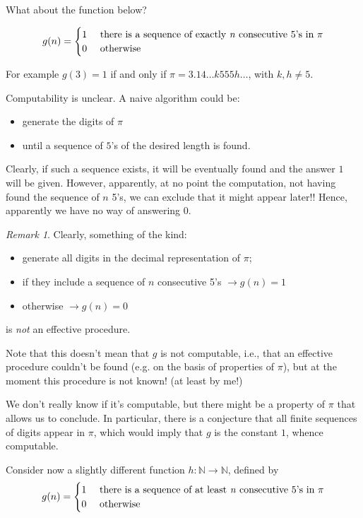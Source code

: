 \documentclass{amsbook}
\newcommand{\nat}{\ensuremath{\mathbb{N}}}
\theoremstyle{definition}
\theoremstyle{remark}
\newtheorem{remark}[theorem]{Remark}
\numberwithin{section}{chapter}
\numberwithin{equation}{chapter}
\begin{document}
What about the function below?

\begin{equation*}
  g(n) = \begin{cases}
    1 & $ there is a sequence of exactly  \textit{n} consecutive $5$'s in $ \pi \\
    0 & $ otherwise $
	\end{cases}
\end{equation*}

For example $g(3) = 1$ if and only if  $\pi = 3.14 \dots k 555 h \dots $, with $k, h \neq 5$.

Computability is unclear. A naive algorithm could be:
\begin{itemize}
\item generate the digits of $\pi$
\item until a sequence of $5$'s of the desired length is found.
\end{itemize}
Clearly, if such a sequence exists, it will be eventually
found and the answer $1$ will be given. However, apparently, at no point
the computation, not having found the sequence of $n$ 5's,  we can exclude that it might appear later!! Hence, apparently we have no way of answering $0$.

\begin{remark}
  Clearly, something of the kind:
   \begin{itemize}
   \item generate all digits in the decimal representation of $\pi$;
   \item if they include a sequence of $n$ consecutive 5's
    $\rightarrow g(n) = 1$
  \item otherwise $\rightarrow g(n) = 0$
\end{itemize}
is \emph{not} an effective procedure.
\end{remark}

Note that this doesn't mean that $g$ is not computable, i.e., that an
effective procedure couldn't be found (e.g. on the basis of properties
of $\pi$), but at the moment this procedure is not known! (at least by
me!)

We don't really know if it's computable, but there might be a property
of $\pi$ that allows us to conclude. In particular, there is a conjecture that all
finite sequences of digits appear in $\pi$, which would imply that $g$
is the constant $1$, whence computable.

\medskip

Consider now a slightly different function $h: \nat \to \nat$, defined by
\begin{equation*}
  g(n) = \begin{cases}
    1 & $ there is a sequence of at least  \textit{n} consecutive $5$'s in $ \pi \\
    0 & $ otherwise $
  \end{cases}
\end{equation*}
\end{document}
